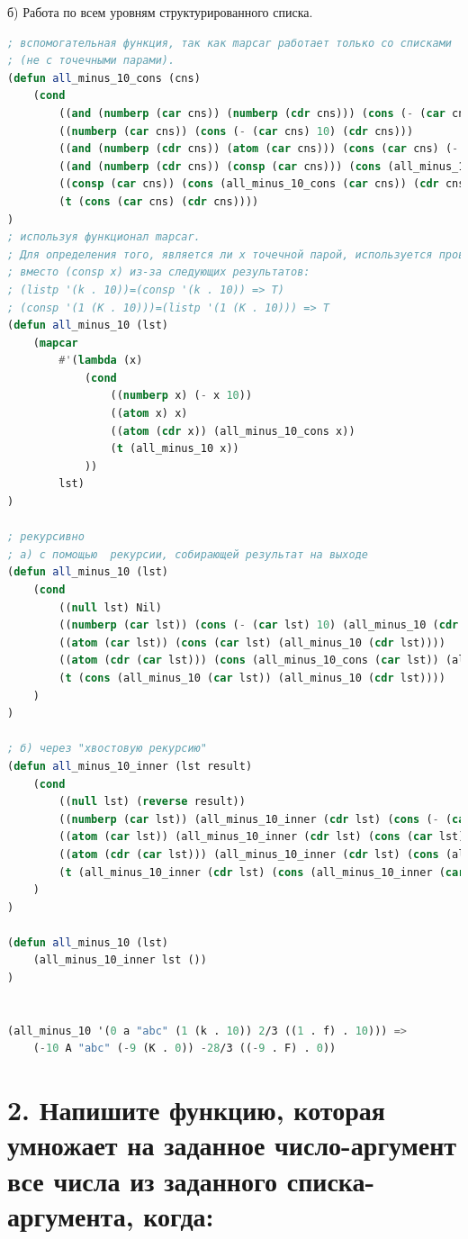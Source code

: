 \documentclass[12pt]{report}
\begin{document}
б) Работа по всем уровням структурированного списка.
\begin{lstlisting}[language=Lisp]
; вспомогательная функция, так как mapcar работает только со списками 
; (не с точечными парами).
(defun all_minus_10_cons (cns)
	(cond 
		((and (numberp (car cns)) (numberp (cdr cns))) (cons (- (car cns) 10) (- (cdr cns) 10)))
		((numberp (car cns)) (cons (- (car cns) 10) (cdr cns)))
		((and (numberp (cdr cns)) (atom (car cns))) (cons (car cns) (- (cdr cns) 10)))
		((and (numberp (cdr cns)) (consp (car cns))) (cons (all_minus_10_cons (car cns)) (- (cdr cns) 10)))
		((consp (car cns)) (cons (all_minus_10_cons (car cns)) (cdr cns)))
		(t (cons (car cns) (cdr cns))))
)
; используя функционал mapcar.
; Для определения того, является ли x точечной парой, используется проверка (atom (cdr x)) 
; вместо (consp x) из-за следующих результатов:
; (listp '(k . 10))=(consp '(k . 10)) => T)
; (consp '(1 (K . 10)))=(listp '(1 (K . 10))) => T
(defun all_minus_10 (lst)
	(mapcar 
		#'(lambda (x) 
			(cond 
				((numberp x) (- x 10))
				((atom x) x)
				((atom (cdr x)) (all_minus_10_cons x))
				(t (all_minus_10 x))	
			))
		lst)
)	

; рекурсивно
; а) с помощью  рекурсии, собирающей результат на выходе
(defun all_minus_10 (lst)
	(cond 
		((null lst) Nil)
		((numberp (car lst)) (cons (- (car lst) 10) (all_minus_10 (cdr lst))))
		((atom (car lst)) (cons (car lst) (all_minus_10 (cdr lst))))
		((atom (cdr (car lst))) (cons (all_minus_10_cons (car lst)) (all_minus_10 (cdr lst))))
		(t (cons (all_minus_10 (car lst)) (all_minus_10 (cdr lst))))
	)
)	

; б) через "хвостовую рекурсию" 
(defun all_minus_10_inner (lst result)
	(cond 
		((null lst) (reverse result))
		((numberp (car lst)) (all_minus_10_inner (cdr lst) (cons (- (car lst) 10) result)))
		((atom (car lst)) (all_minus_10_inner (cdr lst) (cons (car lst) result)))
		((atom (cdr (car lst))) (all_minus_10_inner (cdr lst) (cons (all_minus_10_cons (car lst)) result)))
		(t (all_minus_10_inner (cdr lst) (cons (all_minus_10_inner (car lst) ()) result)))
	)
)

(defun all_minus_10 (lst) 
	(all_minus_10_inner lst ())
)


(all_minus_10 '(0 a "abc" (1 (k . 10)) 2/3 ((1 . f) . 10))) => 
	(-10 A "abc" (-9 (K . 0)) -28/3 ((-9 . F) . 0))
\end{lstlisting}



\clearpage
\section*{2. Напишите функцию, которая умножает на заданное число-аргумент все числа из заданного списка-аргумента, когда:}
\end{document}
